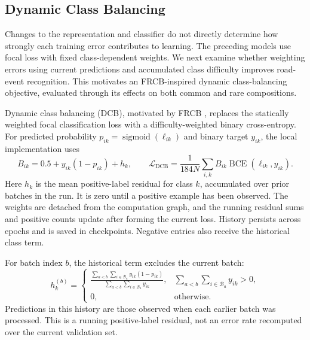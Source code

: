 \clearpage
\begin{samepage}
\section{Dynamic Class Balancing}

Changes to the representation and classifier do not directly determine how strongly each training error contributes to learning. The preceding models use focal loss with fixed class-dependent weights. We next examine whether weighting errors using current predictions and accumulated class difficulty improves road-event recognition. This motivates an FRCB-inspired dynamic class-balancing objective, evaluated through its effects on both common and rare compositions.
\par
\end{samepage}

Dynamic class balancing (DCB), motivated by FRCB \cite{frcb}, replaces the statically weighted focal classification loss with a difficulty-weighted binary cross-entropy. For predicted probability \(p_{ik}=\operatorname{sigmoid}(\ell_{ik})\) and binary target \(y_{ik}\), the local implementation uses
\begin{equation}\label{eq:dcb}
 B_{ik}=0.5+y_{ik}(1-p_{ik})+h_k,\qquad
 \mathcal{L}_{\mathrm{DCB}}=\frac{1}{184N}\sum_{i,k}B_{ik}\operatorname{BCE}(\ell_{ik},y_{ik}).
\end{equation}
Here \(h_k\) is the mean positive-label residual for class \(k\), accumulated over prior batches in the run. It is zero until a positive example has been observed. The weights are detached from the computation graph, and the running residual sums and positive counts update after forming the current loss. History persists across epochs and is saved in checkpoints. Negative entries also receive the historical class term.

For batch index \(b\), the historical term excludes the current batch:
\begin{equation}\label{eq:dcb-history}
 h_k^{(b)}=\begin{cases}
 \displaystyle\frac{\sum_{a<b}\sum_{i\in\mathcal B_a}y_{ik}(1-p_{ik})}
 {\sum_{a<b}\sum_{i\in\mathcal B_a}y_{ik}}, & \displaystyle\sum_{a<b}\sum_{i\in\mathcal B_a}y_{ik}>0,\\[6pt]
 0, & \text{otherwise}.
 \end{cases}
\end{equation}
Predictions in this history are those observed when each earlier batch was processed. This is a running positive-label residual, not an error rate recomputed over the current validation set.

